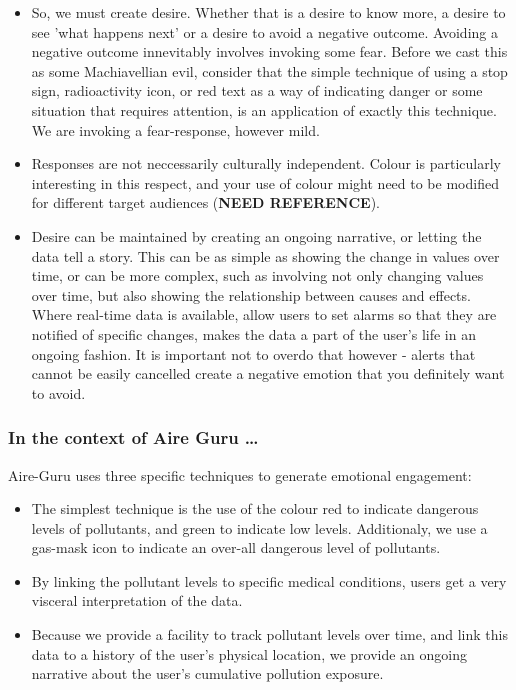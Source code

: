 \begin{itemize}
    \item So, we must create desire. Whether that is a desire to know more, a desire to see 'what happens next' or a desire to avoid a negative outcome.
    Avoiding a negative outcome innevitably involves invoking some fear. Before we cast this as some Machiavellian evil, consider that the simple
    technique of using a stop sign, radioactivity icon, or red text as a way of indicating danger or some situation that requires attention, is an
    application of exactly this technique. We are invoking a fear-response, however mild.

    \item Responses are not neccessarily culturally independent. Colour is particularly interesting in this respect, and your use of colour might
    need to be modified for different target audiences (\textbf{NEED REFERENCE}).

    \item Desire can be maintained by creating an ongoing narrative, or letting the data tell a story. This can be as simple as showing the change in 
    values over time, or can be more complex, such as involving not only changing values over time, but also showing the relationship between causes and
    effects. Where real-time data is available, allow users to set alarms so that they are notified of specific changes, makes the data a part of the user's
    life in an ongoing fashion. It is important not to overdo that however - alerts that cannot be easily cancelled create a negative emotion that you
    definitely want to avoid.
\end{itemize}

\subsubsection*{In the context of Aire Guru \ldots}

Aire-Guru uses three specific techniques to generate emotional engagement:

\begin{itemize}

    \item The simplest technique is the use of the colour red to indicate dangerous levels of pollutants, and green to indicate low levels.
    Additionaly, we use a gas-mask icon to indicate an over-all dangerous level of pollutants.

    \item By linking the pollutant levels to specific medical conditions, users get a very visceral interpretation of the data.
    
    \item Because we provide a facility to track pollutant levels over time, and link this data to a history of the user's physical location, we provide
    an ongoing narrative about the user's cumulative pollution exposure.

\end{itemize}
